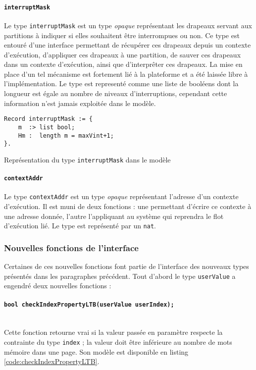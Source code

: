 		\paragraph{\texttt{interruptMask}} Le type \texttt{interruptMask} est un type \emph{opaque} représentant les drapeaux servant aux partitions à indiquer si elles souhaitent être interrompues ou non. Ce type est entouré d'une interface permettant de récupérer ces drapeaux depuis un contexte d'exécution, d'appliquer ces drapeaux à une partition, de sauver ces drapeaux dans un contexte d'exécution, ainsi que d'interprêter ces drapeaux. La mise en place d'un tel mécanisme est fortement lié à la plateforme et a été laissée libre à l'implémentation. Le type est representé comme une liste de booléens dont la longueur est égale au nombre de niveaux d'interruptions, cependant cette information n'est jamais exploitée dans le modèle.
		\begin{listing}[!ht]
			\begin{verbatim}
Record interruptMask := {
    m  :> list bool;
    Hm :  length m = maxVint+1;
}.
			\end{verbatim}
			\caption{Représentation du type \texttt{interruptMask} dans le modèle}
		\end{listing}

		\paragraph{\texttt{contextAddr}} Le type \texttt{contextAddr} est un type \emph{opaque} représentant l'adresse d'un contexte d'exécution. Il est muni de deux fonctions : une permettant d'écrire ce contexte à une adresse donnée, l'autre l'appliquant au système qui reprendra le flot d'exécution lié. Le type est représenté par un \texttt{nat}.


		\subsubsection{Nouvelles fonctions de l'interface}

		Certaines de ces nouvelles fonctions font partie de l'interface des nouveaux types présentés dans les paragraphes précédent. Tout d'abord le type \texttt{userValue} a engendré deux nouvelles fonctions :
		\paragraph{\texttt{bool checkIndexPropertyLTB(userValue userIndex);}}~\\
		Cette fonction retourne vrai si la valeur passée en paramètre respecte la contrainte du type \texttt{index} ; la valeur doit être inférieure au nombre de mots mémoire dans une page. Son modèle est disponible en listing \ref{code:checkIndexPropertyLTB}.

